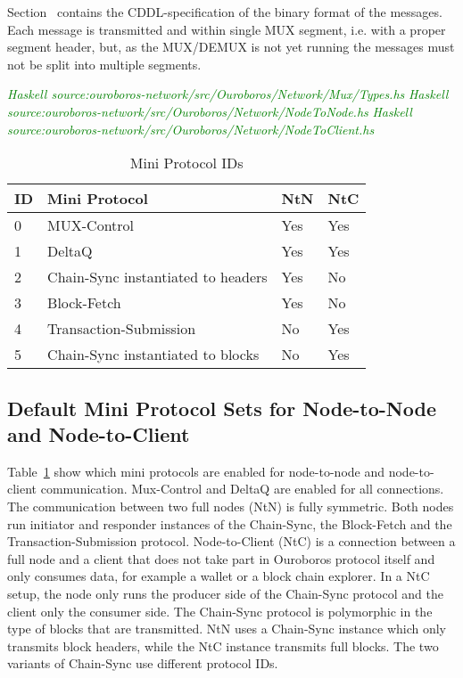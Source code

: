 \documentclass{report}
\newcommand{\hsref}[1]{{\textcolor{green}{\emph{Haskell source:#1}}}}
\theoremstyle{definition}{
  \newtheorem{lemma}{Lemma}[section] %
  \newtheorem{definition}[lemma]{Definition}
}
\theoremstyle{theorem}{
  \newtheorem{invariant}[lemma]{Invariant}
  \newtheorem{proofobligation}[lemma]{Proof Obligation}
}
\numberwithin{equation}{lemma}
\begin{document}
Section~\label{included-cddl} contains the CDDL-specification of the binary format of the messages.
Each message is transmitted and within single MUX segment, i.e. with a proper segment header,
but, as the MUX/DEMUX is not yet running the messages must not be split into multiple segments.

\hsref{ouroboros-network/src/Ouroboros/Network/Mux/Types.hs}
\hsref{ouroboros-network/src/Ouroboros/Network/NodeToNode.hs}
\hsref{ouroboros-network/src/Ouroboros/Network/NodeToClient.hs}

\begin{table}[h]
\centering
\begin{tabular}{|l|l|l|l|}
  \hline
  ID & Mini Protocol                         & NtN  & NtC \\ \hline
  0  & MUX-Control                           & Yes  & Yes \\ \hline
  1  & DeltaQ                                & Yes  & Yes \\ \hline
  2  & Chain-Sync instantiated to headers    & Yes  & No \\ \hline
  3  & Block-Fetch                           & Yes  & No  \\ \hline
  4  & Transaction-Submission                & No   & Yes  \\ \hline
  5  & Chain-Sync instantiated to blocks     & No   & Yes  \\ \hline
\end{tabular}
\caption{Mini Protocol IDs}
\label{mini-protocol-id}
\end{table}

\subsection{Default Mini Protocol Sets for Node-to-Node and Node-to-Client}
Table~\ref{mini-protocol-id} show which mini protocols are enabled for node-to-node
and node-to-client communication.
Mux-Control and DeltaQ are enabled for all connections.
The communication between two full nodes (NtN) is fully symmetric.
Both nodes run initiator and responder instances of the
Chain-Sync, the Block-Fetch and the Transaction-Submission protocol.
Node-to-Client (NtC) is a connection between a full node and a client that does not take part in
Ouroboros protocol itself and only consumes data, for example a wallet or a block chain explorer.
In a NtC setup, the node only runs the producer side of the Chain-Sync protocol and the client only the
consumer side.
The Chain-Sync protocol is polymorphic in the type of blocks that are transmitted.
NtN uses a Chain-Sync instance which only transmits block headers, while the NtC instance transmits
full blocks.
The two variants of Chain-Sync use different protocol IDs.
\end{document}
